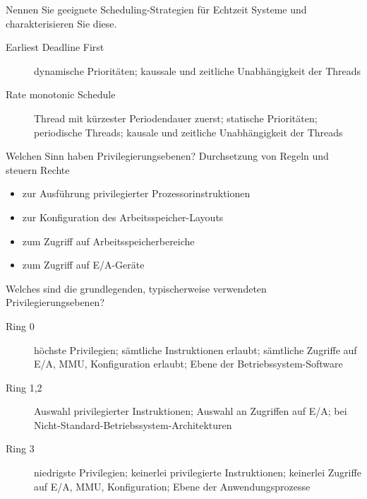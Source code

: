 \documentclass[avery5371]{flashcards}
\begin{document}
\begin{flashcard}{Nennen Sie geeignete Scheduling-Strategien für Echtzeit Systeme und charakterisieren Sie diese.}
    \begin{description}
        \item[Earliest Deadline First] dynamische Prioritäten; kaussale und zeitliche Unabhängigkeit der Threads
        \item[Rate monotonic Schedule] Thread mit kürzester Periodendauer zuerst; statische Prioritäten; periodische Threads; kausale und zeitliche Unabhängigkeit der Threads
    \end{description}
\end{flashcard}

\begin{flashcard}[Privilegierungsebenen]{Welchen Sinn haben Privilegierungsebenen?}
    Durchsetzung von Regeln und steuern Rechte
    \begin{itemize}
        \item zur Ausführung privilegierter Prozessorinstruktionen
        \item zur Konfiguration des Arbeitsspeicher-Layouts
        \item zum Zugriff auf Arbeitsspeicherbereiche
        \item zum Zugriff auf E/A-Geräte
    \end{itemize}
\end{flashcard}

\begin{flashcard}[Privilegierungsebenen]{Welches sind die grundlegenden, typischerweise verwendeten Privilegierungsebenen?}
    \begin{description}
        \item[Ring 0] höchste Privilegien; sämtliche Instruktionen erlaubt; sämtliche Zugriffe auf E/A, MMU, Konfiguration erlaubt; Ebene der Betriebssystem-Software
        \item[Ring 1,2] Auswahl privilegierter Instruktionen; Auswahl an Zugriffen auf E/A; bei Nicht-Standard-Betriebssystem-Architekturen
        \item[Ring 3] niedrigste Privilegien; keinerlei privilegierte Instruktionen; keinerlei Zugriffe auf E/A, MMU, Konfiguration; Ebene der Anwendungsprozesse
    \end{description}
\end{flashcard}
\end{document}
